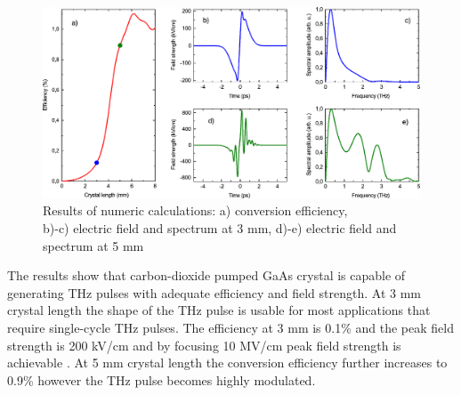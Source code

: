 \documentclass{article}
\begin{document}

\begin{figure}[H]\centering
\includegraphics[width=\textwidth]{graph1.pdf}
\caption{Results of numeric calculations: a) conversion efficiency, \\b)-c) electric field and spectrum at 3 mm, d)-e) electric field and spectrum at 5 mm}
\label{fig1}
\end{figure}


The results show that carbon\hyp{}dioxide pumped GaAs crystal is capable of generating THz pulses with adequate efficiency and field strength. At 3 mm crystal length the shape of the THz pulse is usable for most applications that require single-cycle THz pulses. The efficiency at 3 mm is 0.1\% and the peak field strength is 200 kV/cm and by focusing 10 MV/cm peak field strength is achievable \cite{Tibai:22}. At 5 mm crystal length the conversion efficiency further increases to 0.9\% however the THz pulse becomes highly modulated.

\begin{flushleft}
\printbibliography[title=\normalsize References]
\end{flushleft}
\end{document}
